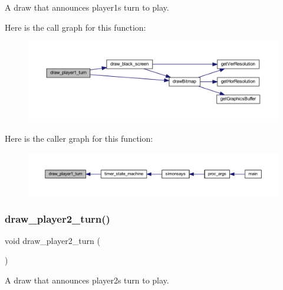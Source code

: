 A draw that announces player1\textquotesingle{}s turn to play. 

Here is the call graph for this function\+:\nopagebreak
\begin{figure}[H]
\begin{center}
\leavevmode
\includegraphics[width=350pt]{group___bitmap_gaca0d178c01fee283d1e3386b9712736e_cgraph}
\end{center}
\end{figure}
Here is the caller graph for this function\+:\nopagebreak
\begin{figure}[H]
\begin{center}
\leavevmode
\includegraphics[width=350pt]{group___bitmap_gaca0d178c01fee283d1e3386b9712736e_icgraph}
\end{center}
\end{figure}
\mbox{\label{group___bitmap_ga9af400ed66deb4c3aff712d9a7e9f522}} 
\subsubsection{\texorpdfstring{draw\+\_\+player2\+\_\+turn()}{draw\_player2\_turn()}}
{\footnotesize\ttfamily void draw\+\_\+player2\+\_\+turn (\begin{DoxyParamCaption}{ }\end{DoxyParamCaption})}



A draw that announces player2\textquotesingle{}s turn to play. 

